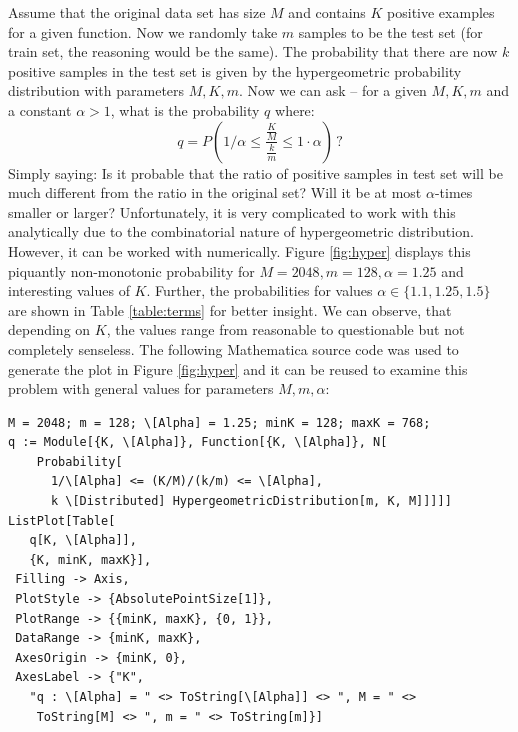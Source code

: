 \documentclass[11pt,twoside,a4paper]{book}
\begin{document}
Assume that the original data set has size $M$ and contains $K$
positive examples for a given function.
Now we randomly take $m$ samples to be the test set (for train set, the reasoning would be the same).
The probability that there are now $k$ positive samples 
in the test set is given by the hypergeometric probability distribution with parameters $M,K,m$.
Now we can ask -- for a given $M, K, m$ and a constant $\alpha > 1$, what is the probability $q$ where:
\[ q = P\left(1 / \alpha \le \frac{\frac{K}{M}}{\frac{k}{m}} \le 1 \cdot \alpha \right) \,  ? \]
Simply saying: Is it probable that the ratio of positive samples in test set will be much different
from the ratio in the original set? 
Will it be at most $\alpha$-times smaller or larger?
Unfortunately, it is very complicated to work with this analytically due to the combinatorial 
nature of hypergeometric distribution.
However, it can be worked with numerically.
Figure \ref{fig:hyper} displays this piquantly non-monotonic probability for $M = 2048, m = 128, \alpha = 1.25$ and interesting 
values of $K$.
Further, the probabilities for values $\alpha \in \{1.1, 1.25, 1.5\}$ are shown in Table \ref{table:terms} 
for better insight.
We can observe, that depending on $K$, the values range from reasonable to questionable but not completely senseless.
The following Mathematica source code was used to generate the plot in Figure \ref{fig:hyper}
and it can be reused to examine this problem with general values for parameters $M,m,\alpha$:
\begin{verbatim}
M = 2048; m = 128; \[Alpha] = 1.25; minK = 128; maxK = 768;
q := Module[{K, \[Alpha]}, Function[{K, \[Alpha]}, N[
    Probability[
      1/\[Alpha] <= (K/M)/(k/m) <= \[Alpha],
      k \[Distributed] HypergeometricDistribution[m, K, M]]]]] 
ListPlot[Table[
   q[K, \[Alpha]],
   {K, minK, maxK}],
 Filling -> Axis,
 PlotStyle -> {AbsolutePointSize[1]},
 PlotRange -> {{minK, maxK}, {0, 1}},
 DataRange -> {minK, maxK},
 AxesOrigin -> {minK, 0},
 AxesLabel -> {"K", 
   "q : \[Alpha] = " <> ToString[\[Alpha]] <> ", M = " <> 
    ToString[M] <> ", m = " <> ToString[m]}]
\end{verbatim}
\end{document}
